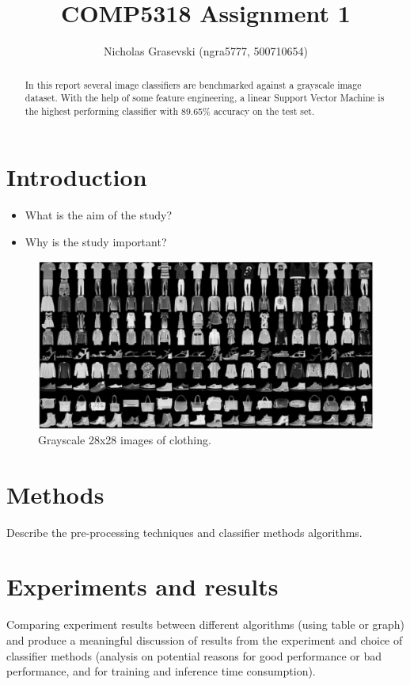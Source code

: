 \documentclass[landscape,twocolumn]{article}
\title{COMP5318 Assignment 1}
\author{Nicholas Grasevski (ngra5777, 500710654)}
\begin{document}
\maketitle
\begin{abstract}
In this report several image classifiers are benchmarked against a grayscale image dataset. With the help of some feature engineering, a linear Support Vector Machine is the highest performing classifier with 89.65\% accuracy on the test set.
\end{abstract}

\section{Introduction}
\begin{itemize}
\item What is the aim of the study?
\item Why is the study important?
\end{itemize}

\begin{figure}[ht]
\caption{Grayscale 28x28 images of clothing.}
\includegraphics[width=\linewidth]{../Dataset_image}
\end{figure}

\section{Methods}
Describe the pre-processing techniques and classifier methods algorithms.

\section{Experiments and results}
Comparing experiment results between different algorithms (using table or graph) and produce a meaningful discussion of results from the experiment and choice of classifier methods (analysis on potential reasons for good performance or bad performance, and for training and inference time consumption).
\end{document}
